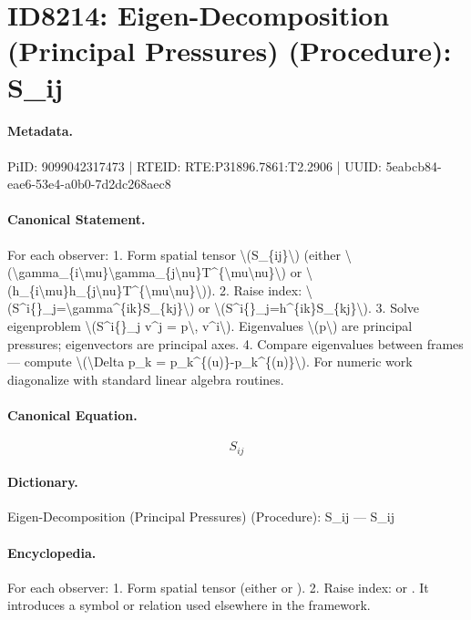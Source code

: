 \section*{ID8214: Eigen-Decomposition (Principal Pressures) (Procedure): S\_ij}
\paragraph{Metadata.}
PiID: 9099042317473 | RTEID: RTE:P31896.7861:T2.2906 | UUID: 5eabcb84-eae6-53e4-a0b0-7d2dc268aec8

\paragraph{Canonical Statement.}
For each observer: 1. Form spatial tensor \textbackslash{}(S\_\{ij\}\textbackslash{}) (either \textbackslash{}(\textbackslash{}gamma\_\{i\textbackslash{}mu\}\textbackslash{}gamma\_\{j\textbackslash{}nu\}T\textasciicircum{}\{\textbackslash{}mu\textbackslash{}nu\}\textbackslash{}) or \textbackslash{}(h\_\{i\textbackslash{}mu\}h\_\{j\textbackslash{}nu\}T\textasciicircum{}\{\textbackslash{}mu\textbackslash{}nu\}\textbackslash{})). 2. Raise index: \textbackslash{}(S\textasciicircum{}i\{\}\_j=\textbackslash{}gamma\textasciicircum{}\{ik\}S\_\{kj\}\textbackslash{}) or \textbackslash{}(S\textasciicircum{}i\{\}\_j=h\textasciicircum{}\{ik\}S\_\{kj\}\textbackslash{}). 3. Solve eigenproblem \textbackslash{}(S\textasciicircum{}i\{\}\_j v\textasciicircum{}j = p\textbackslash{}, v\textasciicircum{}i\textbackslash{}). Eigenvalues \textbackslash{}(p\textbackslash{}) are principal pressures; eigenvectors are principal axes. 4. Compare eigenvalues between frames — compute \textbackslash{}(\textbackslash{}Delta p\_k = p\_k\textasciicircum{}\{(u)\}-p\_k\textasciicircum{}\{(n)\}\textbackslash{}). For numeric work diagonalize with standard linear algebra routines.

\paragraph{Canonical Equation.}
\[
S_{ij}
\]

\paragraph{Dictionary.}
Eigen-Decomposition (Principal Pressures) (Procedure): S\_ij — S\_ij

\paragraph{Encyclopedia.}
For each observer: 1. Form spatial tensor (either or ). 2. Raise index: or . It introduces a symbol or relation used elsewhere in the framework.
